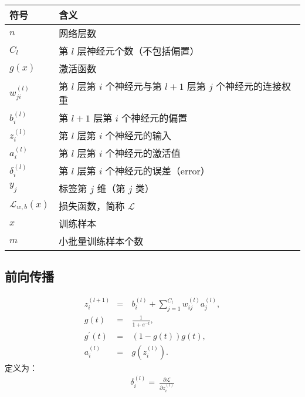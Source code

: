 \documentclass[letterpaper,10pt,english]{sphinxmanual}
\begin{document}
\begin{savenotes}\sphinxattablestart
\centering
{}
\label{\detokenize{deepLearning/07_backprop:id5}}
\sphinxaftercaption
\begin{tabulary}{\linewidth}[t]{|T|T|}
\hline
\sphinxstyletheadfamily 
符号
&\sphinxstyletheadfamily 
含义
\\
\hline
\(n\)
&
网络层数
\\
\hline
\(C_l\)
&
第 \(l\) 层神经元个数（不包括偏置）
\\
\hline
\(g(x)\)
&
激活函数
\\
\hline
\(w^{(l)}_{ji}\)
&
第 \(l\) 层第 \(i\) 个神经元与第 \(l+1\) 层第 \(j\) 个神经元的连接权重
\\
\hline
\(b^{(l)}_i\)
&
第 \(l+1\) 层第 \(i\) 个神经元的偏置
\\
\hline
\(z^{(l)}_i\)
&
第 \(l\) 层第 \(i\) 个神经元的输入
\\
\hline
\(a^{(l)}_i\)
&
第 \(l\) 层第 \(i\) 个神经元的激活值
\\
\hline
\(\delta^{(l)}_i\)
&
第 \(l\) 层第 \(i\) 个神经元的误差（error）
\\
\hline
\(y_j\)
&
标签第 \(j\) 维（第 \(j\) 类）
\\
\hline
\(\mathcal{L}_{w,b}(x)\)
&
损失函数，简称 \(\mathcal{L}\)
\\
\hline
\(x\)
&
训练样本
\\
\hline
\(m\)
&
小批量训练样本个数
\\
\hline
\end{tabulary}
\par
\sphinxattableend\end{savenotes}


\subsection{前向传播}
\label{\detokenize{deepLearning/07_backprop:id2}}\begin{equation*}
\begin{split}z^{(l+1)}_i & = & \  b^{(l)}_i + \sum_{j=1}^{C_l}w^{(l)}_{ij}a^{(l)}_j, \\
g(t) & = & \  \frac{1}{1 + e^{-t}}, \\
g^{\prime}(t) & = & \ (1 - g(t))g(t) , \\
a^{(l)}_i & = & \  g(z^{(l)}_i).\end{split}
\end{equation*}
 定义为：
\begin{equation*}
\begin{split}\delta^{(l)}_i = \  \frac{\partial{\mathcal{L}}}{\partial{z^{(l)}_i}}\end{split}
\end{equation*}
\end{document}
